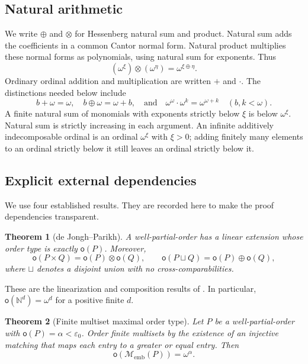 \documentclass[11pt,letterpaper]{article}
\theoremstyle{plain}
\newtheorem{theorem}{Theorem}[section]
\theoremstyle{definition}
\theoremstyle{remark}
\newcommand{\N}{\mathbb N}
\newcommand{\mot}{\mathsf o}
\newcommand{\Memb}{\mathcal M_{\mathrm{emb}}}
\newcommand{\eps}{\varepsilon}
\begin{document}
\subsection{Natural arithmetic}

We write $\oplus$ and $\otimes$ for Hessenberg natural sum and product.
Natural sum adds the coefficients in a common Cantor normal form. Natural
product multiplies these normal forms as polynomials, using natural sum
for exponents. Thus
\[
 (\omega^\xi)\otimes(\omega^\eta)=\omega^{\xi\oplus\eta}.
\]
Ordinary ordinal addition and multiplication are written $+$ and
$\cdot$. The distinctions needed below include
\[
 b+\omega=\omega,\quad b\oplus\omega=\omega+b,
 \quad\text{and}\quad
 \omega^\omega\cdot\omega^k=\omega^{\omega+k}
 \quad(b,k<\omega).
\]
A finite natural sum of monomials with exponents strictly below $\xi$
is below $\omega^\xi$. Natural sum is strictly increasing in each
argument. An infinite additively indecomposable ordinal is an ordinal
$\omega^\xi$ with $\xi>0$; adding finitely many elements to an ordinal
strictly below it still leaves an ordinal strictly below it.

\subsection{Explicit external dependencies}

We use four established results. They are recorded here to make the proof
dependencies transparent.

\begin{theorem}[de Jongh--Parikh]\label{thm:standardmot}
A well-partial-order has a linear extension whose order type is exactly
$\mot(P)$. Moreover,
\[
 \mot(P\times Q)=\mot(P)\otimes\mot(Q),
 \qquad
 \mot(P\sqcup Q)=\mot(P)\oplus\mot(Q),
\]
where $\sqcup$ denotes a disjoint union with no cross-comparabilities.
\end{theorem}

These are the linearization and composition results of
\cite{deJonghParikh}. In particular, $\mot(\N^d)=\omega^d$ for a positive
finite $d$.

\begin{theorem}[Finite multiset maximal order type]\label{thm:multiset}
Let $P$ be a well-partial-order with $\mot(P)=\alpha<\eps_0$.
Order finite multisets by the existence of an injective matching that
maps each entry to a greater or equal entry. Then
\[
 \mot(\Memb(P))=\omega^\alpha.
\]
\end{theorem}
\end{document}
